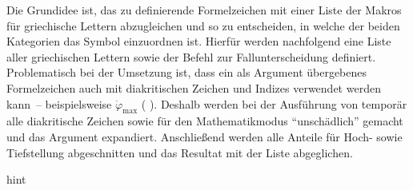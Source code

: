 \documentclass[%
  english,ngerman,%
  cdgeometry=no,DIV=12,%
  cd=false,cdfont=false,cdtitle=true,%
  headings=normal,%
  automark,%
  listof=toc,%
]{tudscrartcl}
\begin{document}
Die Grundidee ist, das zu definierende Formelzeichen mit einer Liste der Makros 
für griechische Lettern abzugleichen und so zu entscheiden, in welche der 
beiden Kategorien das Symbol einzuordnen ist. Hierfür werden nachfolgend eine 
Liste  aller griechischen Lettern sowie der Befehl 
zur Fallunterscheidung definiert. Problematisch bei der Umsetzung ist, dass ein 
als Argument übergebenes Formelzeichen auch mit diakritischen Zeichen und 
Indizes verwendet werden kann~-- beispielsweise $\dot{\varphi}_{\mathrm{max}}$
(%
  \PValue{\textunderscore}%
). Deshalb werden bei der Ausführung von  temporär alle 
diakritische Zeichen sowie  für den Mathematikmodus 
\enquote{unschädlich} gemacht und das Argument  expandiert. 
Anschließend werden alle Anteile für Hoch- sowie Tiefstellung abgeschnitten und 
das Resultat mit der Liste  abgeglichen.
%
\CodeHook{\let\newcommand\renewcommand}
\begin{Code}{hint}
\makeatletter
\newcommand*\greeksymbollist{}
\def\@tempa#1{\ifdefvoid{#1}{}{\listadd\greeksymbollist{#1}}}
\forcsvlist{\@tempa}{%
  \alpha,\beta,\varbeta,\gamma,\delta,\epsilon,\varepsilon,\zeta,%
  \eta,\theta,\vartheta,\iota,\kappa,\varkappa,\lambda,\mu,\nu,%
  \xi,\omicron,\pi,\varpi,\rho,\varrho,\sigma,\varsigma,\tau,%
  \upsilon,\phi,\varphi,\chi,\psi,\omega,%
  \Alpha,\Beta,\Gamma,\Delta,\Epsilon,\Zeta,\Eta,\Theta,\Iota,%
  \Kappa,\Lambda,\Mu,\Nu,\Xi,\Omicron,\Pi,\Rho,\Sigma,\Tau,\Upsilon,%
  \Phi,\Chi,\Psi,\Omega%
}
\newcommand*\ifisgreeksymbol[1]{%
  \begingroup%
    \def\@tempa##1{\let##1\@firstofone}%
    \forcsvlist{\@tempa}{%
      \acute,\bar,\breve,\check,\dot,\ddot,\dddot,\ddddot,%
      \hat,\widehat,\grave,\tilde,\widetilde,\vec,%
      \Acute,\Bar,\Breve,\Check,\Dot,\Ddot,\Hat,\Grave,\Tilde,\Vec%
    }%
    \def\boldsymbol{}%
    \protected@edef\@tempa{#1}%
    \def\@tempb##1_##2\relax{\def\@tempa{##1}}%
    \expandafter\@tempb\@tempa_\relax\relax%
    \def\@tempb##1^##2\relax{\def\@tempa{##1}}%
    \expandafter\@tempb\@tempa^\relax\relax%
    \expandafter\ifinlist\expandafter{\@tempa}{\greeksymbollist}{%
      \aftergroup\@firstoftwo%
    }{%
      \aftergroup\@secondoftwo%
    }%
  \endgroup%
}
\makeatother
\end{Code}
\end{document}
